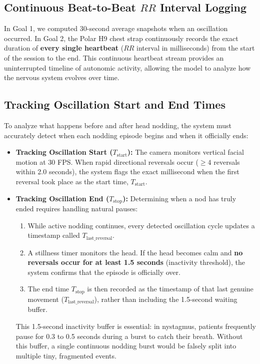 \documentclass[12pt,a4paper,oneside]{report}
\begin{document}
\subsection{Continuous Beat-to-Beat $RR$ Interval Logging}
In Goal 1, we computed 30-second average snapshots when an oscillation occurred. In Goal 2, the Polar H9 chest strap continuously records the exact duration of \textbf{every single heartbeat} ($RR$ interval in milliseconds) from the start of the session to the end. This continuous heartbeat stream provides an uninterrupted timeline of autonomic activity, allowing the model to analyze how the nervous system evolves over time.

\subsection{Tracking Oscillation Start and End Times}
To analyze what happens before and after head nodding, the system must accurately detect when each nodding episode begins and when it officially ends:
\begin{itemize}[leftmargin=1.2cm]
    \item \textbf{Tracking Oscillation Start ($T_{\text{start}}$):} The camera monitors vertical facial motion at 30 FPS. When rapid directional reversals occur ($\ge 4$ reversals within 2.0 seconds), the system flags the exact millisecond when the first reversal took place as the start time, $T_{\text{start}}$.
    
    \item \textbf{Tracking Oscillation End ($T_{\text{stop}}$):} Determining when a nod has truly ended requires handling natural pauses:
    \begin{enumerate}[leftmargin=0.8cm, label=\alph*.]
        \item While active nodding continues, every detected oscillation cycle updates a timestamp called $T_{\text{last\_reversal}}$.
        \item A stillness timer monitors the head. If the head becomes calm and \textbf{no reversals occur for at least 1.5 seconds} (inactivity threshold), the system confirms that the episode is officially over.
        \item The end time $T_{\text{stop}}$ is then recorded as the timestamp of that last genuine movement ($T_{\text{last\_reversal}}$), rather than including the 1.5-second waiting buffer.
    \end{enumerate}
    This 1.5-second inactivity buffer is essential: in nystagmus, patients frequently pause for 0.3 to 0.5 seconds during a burst to catch their breath. Without this buffer, a single continuous nodding burst would be falsely split into multiple tiny, fragmented events.
\end{itemize}
\end{document}
